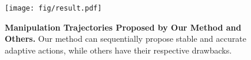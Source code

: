 \begin{figure}
  \texttt{[image: fig/result.pdf]}
  \caption{\textbf{Manipulation Trajectories Proposed by Our Method and Others.} Our method can sequentially propose stable and accurate adaptive actions, while others have their respective drawbacks.}
  \label{fig:sim_result}
\end{figure}
